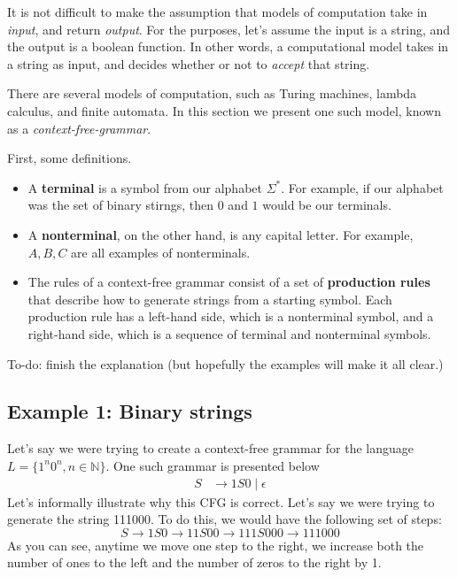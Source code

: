 \documentclass{article}
\begin{document}
    \vspace{2mm}
    It is not difficult to make the assumption that models of computation take in \textit{input}, and return \textit{output}. For the purposes, let's assume the input is a string, and the output is a boolean function. In other words, a computational model takes in a string as input, and decides whether or not to \textit{accept} that string.

    \vspace{3mm}
    There are several models of computation, such as Turing machines, lambda calculus, and finite automata. In this section we present one such model, known as a \textit{context-free-grammar}.

    \vspace{2mm}
    First, some definitions.
    \begin{itemize}
        \item A \textbf{terminal} is a symbol from our alphabet $\Sigma^{*}$. For example, if our alphabet was the set of binary stirngs, then $0$ and $1$ would be our terminals.
        \item A \textbf{nonterminal}, on the other hand, is any capital letter. For example, $A, B, C$ are all examples of nonterminals.
        \item The rules of a context-free grammar consist of a set of \textbf{production rules} that describe how to generate strings from a starting symbol. Each production rule has a left-hand side, which is a nonterminal symbol, and a right-hand side, which is a sequence of terminal and nonterminal symbols.
    \end{itemize}
    To-do: finish the explanation (but hopefully the examples will make it all clear.)
    
\subsection*{Example 1: Binary strings}

    Let's say we were trying to create a context-free grammar for the language $L = \{1^{n}0^{n}, n \in \mathbb{N}\}$. One such grammar is presented below
    \begin{align*}
        S &\rightarrow 1S0 \mid \epsilon
    \end{align*}
    Let's informally illustrate why this CFG is correct. Let's say we were trying to generate the string 111000. To do this, we would have the following set of steps:
    $$S \rightarrow 1S0 \rightarrow 11S00 \rightarrow 111S000 \rightarrow 111000$$
    As you can see, anytime we move one step to the right, we increase both the number of ones to the left and the number of zeros to the right by 1.
\end{document}
